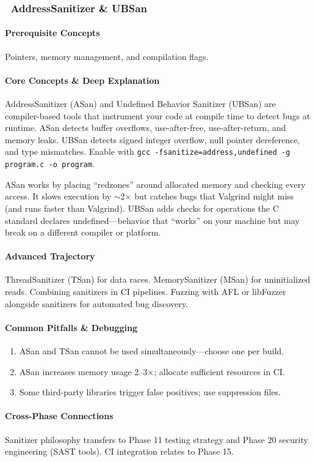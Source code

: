 \documentclass[11pt, a4paper, oneside]{report}
\newcommand{\awareness}[1]{\subsubsection{\texorpdfstring{\fcolorbox{gray!50}{gray!10}{\footnotesize\bfseries\color{gray!50!black} AWARENESS}~#1}{#1}}}
\begin{document}
\awareness{AddressSanitizer \& UBSan}

\paragraph{Prerequisite Concepts} Pointers, memory management, and compilation flags.

\paragraph{Core Concepts \& Deep Explanation} AddressSanitizer (ASan) and Undefined Behavior Sanitizer (UBSan) are compiler-based tools that instrument your code at compile time to detect bugs at runtime. ASan detects buffer overflows, use-after-free, use-after-return, and memory leaks. UBSan detects signed integer overflow, null pointer dereference, and type mismatches. Enable with \texttt{gcc -fsanitize=address,undefined -g program.c -o program}.

ASan works by placing ``redzones'' around allocated memory and checking every access. It slows execution by $\sim$2$\times$ but catches bugs that Valgrind might miss (and runs faster than Valgrind). UBSan adds checks for operations the C standard declares undefined---behavior that ``works'' on your machine but may break on a different compiler or platform.

\paragraph{Advanced Trajectory} ThreadSanitizer (TSan) for data races. MemorySanitizer (MSan) for uninitialized reads. Combining sanitizers in CI pipelines. Fuzzing with AFL or libFuzzer alongside sanitizers for automated bug discovery.

\paragraph{Common Pitfalls \& Debugging}
\begin{enumerate}[leftmargin=*]
\item ASan and TSan cannot be used simultaneously---choose one per build.
\item ASan increases memory usage 2--3$\times$; allocate sufficient resources in CI.
\item Some third-party libraries trigger false positives; use suppression files.
\end{enumerate}

\paragraph{Cross-Phase Connections} Sanitizer philosophy transfers to Phase 11 testing strategy and Phase 20 security engineering (SAST tools). CI integration relates to Phase 15.
\end{document}
